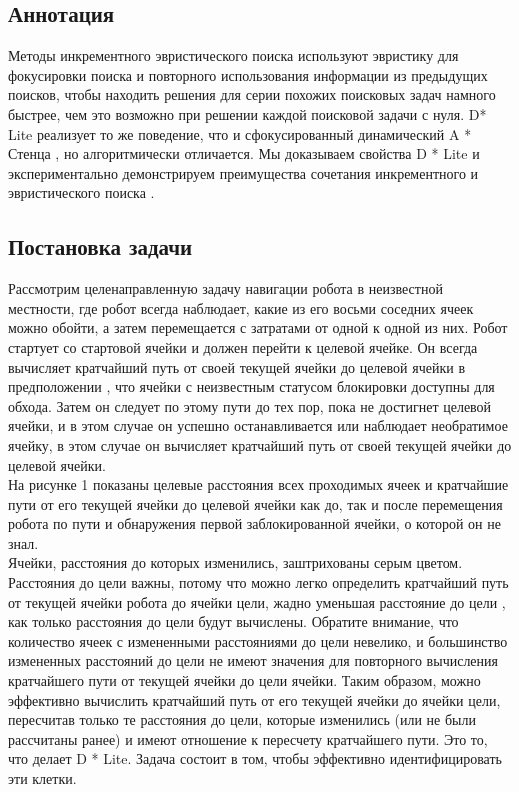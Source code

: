 \documentclass[12pt]{article}
\begin{document}
\begin{center}
   \section*{Аннотация} 
\end{center}
Методы инкрементного эвристического поиска используют эвристику для фокусировки поиска и повторного использования информации из предыдущих поисков, чтобы находить решения для серии похожих поисковых задач намного быстрее, чем это возможно при решении каждой поисковой задачи с нуля. D* Lite
реализует то же поведение, что и сфокусированный динамический A * Стенца
, но алгоритмически отличается. Мы доказываем свойства D * Lite и экспериментально демонстрируем преимущества  сочетания инкрементного и эвристического поиска . 
\newpage
\begin{center}
   \section*{Постановка задачи} 
\end{center}
Рассмотрим целенаправленную задачу навигации робота в неизвестной местности, где робот всегда наблюдает, какие из его восьми соседних ячеек можно обойти, а затем перемещается с затратами от одной к одной из них. Робот стартует со стартовой ячейки и должен перейти к целевой ячейке. Он всегда вычисляет кратчайший путь от своей текущей ячейки до целевой ячейки в предположении , что ячейки с неизвестным статусом блокировки доступны для обхода. Затем он следует по этому пути до тех пор, пока не достигнет целевой ячейки, и в этом случае он успешно останавливается или наблюдает необратимое ячейку,  в этом случае он вычисляет кратчайший путь от своей текущей ячейки до целевой ячейки.\\
На рисунке 1 показаны целевые расстояния всех проходимых ячеек и кратчайшие пути от его текущей ячейки до целевой ячейки как до, так и после перемещения робота по пути и обнаружения первой заблокированной ячейки, о которой он не знал. \\
Ячейки, расстояния до которых изменились, заштрихованы серым цветом. Расстояния до цели важны, потому что можно легко определить кратчайший путь от текущей ячейки робота до ячейки цели, жадно уменьшая расстояние до цели , как только расстояния до цели будут вычислены. Обратите внимание, что количество ячеек с измененными расстояниями до цели невелико, и большинство измененных расстояний до цели не имеют значения для повторного вычисления кратчайшего пути от текущей ячейки до цели ячейки. Таким образом, можно эффективно вычислить кратчайший путь от его текущей ячейки до ячейки цели, пересчитав только те расстояния до цели, которые изменились (или не были рассчитаны ранее) и имеют отношение к пересчету кратчайшего пути. Это то, что делает D * Lite. Задача состоит в том, чтобы эффективно идентифицировать эти клетки. 
\end{document}
